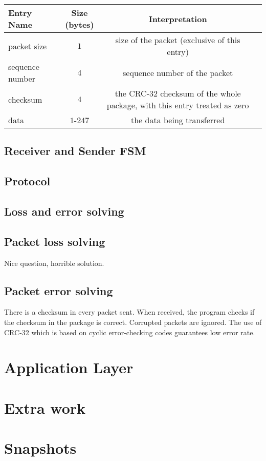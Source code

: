 \documentclass[10pt,a4paper]{article}
\begin{document}
\begin{center}
    \begin{tabular}{lccc}
        Entry Name & Size (bytes) & Interpretation \\%
            \hline
        packet size & $1$ &  size of the packet (exclusive of this entry)\\ 
        sequence number & $4$ & sequence number of the packet\\
        checksum & $4$ & the CRC-32 checksum of the whole package, with this entry treated as zero\\
        data & $1$-$247$ & the data being transferred\\
    \end{tabular}
\end{center}

    
\subsection{Receiver and Sender FSM}
\subsection{Protocol}
\subsection{Loss and error solving}
    \subsection{Packet loss solving}
        Nice question, horrible solution.
    \subsection{Packet error solving}
        There is a checksum in every packet sent. When received, the program checks if the checksum in the package is correct. Corrupted packets are ignored. The use of CRC-32 which is based on cyclic error-checking codes guarantees low error rate.

\section{Application Layer}
\section{Extra work}
\section{Snapshots}
\end{document}
